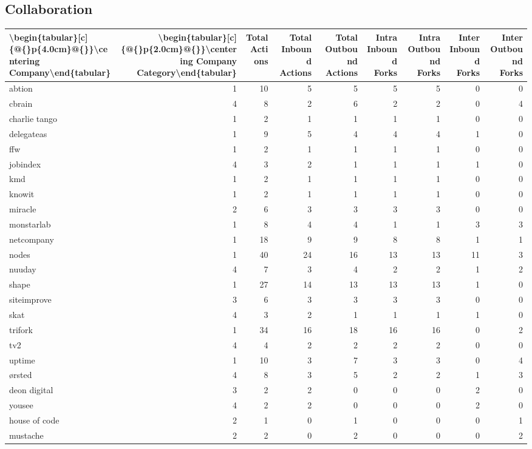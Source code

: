 \subsection{Collaboration}
\newpage
\small
\begin{table}
\centering
\begin{tabular}{lrrrrrrrr}
\toprule
\textbackslash begin\{tabular\}[c]\{@\{\}p\{4.0cm\}@\{\}\}\textbackslash centering Company\textbackslash end\{tabular\} & \textbackslash begin\{tabular\}[c]\{@\{\}p\{2.0cm\}@\{\}\}\textbackslash centering Company Category\textbackslash end\{tabular\} & Total Actions & Total Inbound Actions & Total Outbound Actions & Intra Inbound Forks & Intra Outbound Forks & Inter Inbound Forks & Inter Outbound Forks \\
\midrule
abtion & 1 & 10 & 5 & 5 & 5 & 5 & 0 & 0 \\
cbrain & 4 & 8 & 2 & 6 & 2 & 2 & 0 & 4 \\
charlie tango & 1 & 2 & 1 & 1 & 1 & 1 & 0 & 0 \\
delegateas & 1 & 9 & 5 & 4 & 4 & 4 & 1 & 0 \\
ffw & 1 & 2 & 1 & 1 & 1 & 1 & 0 & 0 \\
jobindex & 4 & 3 & 2 & 1 & 1 & 1 & 1 & 0 \\
kmd & 1 & 2 & 1 & 1 & 1 & 1 & 0 & 0 \\
knowit & 1 & 2 & 1 & 1 & 1 & 1 & 0 & 0 \\
miracle & 2 & 6 & 3 & 3 & 3 & 3 & 0 & 0 \\
monstarlab & 1 & 8 & 4 & 4 & 1 & 1 & 3 & 3 \\
netcompany & 1 & 18 & 9 & 9 & 8 & 8 & 1 & 1 \\
nodes & 1 & 40 & 24 & 16 & 13 & 13 & 11 & 3 \\
nuuday & 4 & 7 & 3 & 4 & 2 & 2 & 1 & 2 \\
shape & 1 & 27 & 14 & 13 & 13 & 13 & 1 & 0 \\
siteimprove & 3 & 6 & 3 & 3 & 3 & 3 & 0 & 0 \\
skat & 4 & 3 & 2 & 1 & 1 & 1 & 1 & 0 \\
trifork & 1 & 34 & 16 & 18 & 16 & 16 & 0 & 2 \\
tv2 & 4 & 4 & 2 & 2 & 2 & 2 & 0 & 0 \\
uptime & 1 & 10 & 3 & 7 & 3 & 3 & 0 & 4 \\
ørsted & 4 & 8 & 3 & 5 & 2 & 2 & 1 & 3 \\
deon digital & 3 & 2 & 2 & 0 & 0 & 0 & 2 & 0 \\
yousee & 4 & 2 & 2 & 0 & 0 & 0 & 2 & 0 \\
house of code & 2 & 1 & 0 & 1 & 0 & 0 & 0 & 1 \\
mustache & 2 & 2 & 0 & 2 & 0 & 0 & 0 & 2 \\
\bottomrule
\end{tabular}

\end{table}

